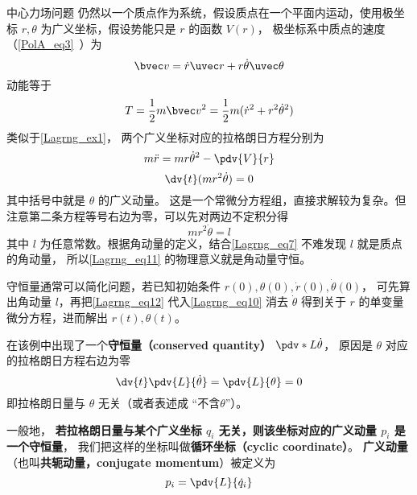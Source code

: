 \begin{example}{中心力场问题}
仍然以一个质点作为系统，假设质点在一个平面内运动，使用极坐标 $r, \theta$ 为广义坐标，假设势能只是 $r$ 的函数 $V(r)$， 极坐标系中质点的速度（\autoref{PolA_eq3}~）为
\begin{equation}\label{Lagrng_eq7}
\bvec v = \dot r\uvec r + r\dot \theta \uvec \theta
\end{equation}
动能等于
\begin{equation}
T = \frac12 m\bvec v^2 = \frac12 m(\dot r^2 + r^2 \dot \theta^2)
\end{equation}
类似于\autoref{Lagrng_ex1}， 两个广义坐标对应的拉格朗日方程分别为
\begin{equation}\label{Lagrng_eq10}
m\ddot r = mr \dot \theta^2 - \pdv{V}{r}
\end{equation}
\begin{equation}\label{Lagrng_eq11}
\dv{t} (m r^2\dot \theta)  = 0
\end{equation}
其中括号中就是 $\theta$ 的广义动量。 这是一个常微分方程组，直接求解较为复杂。但注意第二条方程等号右边为零，可以先对两边不定积分得
\begin{equation}\label{Lagrng_eq12}
mr^2\dot\theta = l
\end{equation}
其中 $l$ 为任意常数。根据角动量的定义，结合\autoref{Lagrng_eq7} 不难发现 $l$ 就是质点的角动量， 所以\autoref{Lagrng_eq11} 的物理意义就是角动量守恒。

守恒量通常可以简化问题，若已知初始条件 $r(0), \theta (0), \dot r(0), \dot\theta (0)$， 可先算出角动量 $l$，再把\autoref{Lagrng_eq12} 代入\autoref{Lagrng_eq10} 消去 $\dot\theta$ 得到关于 $r$ 的单变量微分方程，进而解出 $r(t), \theta (t)$。
\end{example}

在该例中出现了一个\textbf{守恒量（conserved quantity）} $\pdv*{L}{\dot\theta}$， 原因是 $\theta$ 对应的拉格朗日方程右边为零
\begin{equation}
\dv{t}\pdv{L}{\dot\theta} = \pdv{L}{\theta} = 0
\end{equation}
即拉格朗日量与 $\theta$ 无关（或者表述成 “不含$\theta$”）。

一般地， \textbf{若拉格朗日量与某个广义坐标 $q_i$ 无关，则该坐标对应的广义动量 $p_i$ 是一个守恒量}， 我们把这样的坐标叫做\textbf{循环坐标（cyclic coordinate）}。 \textbf{广义动量}（也叫\textbf{共轭动量，conjugate momentum}）被定义为
\begin{equation}\label{Lagrng_eq13}
p_i = \pdv{L}{\dot q_i}
\end{equation}

